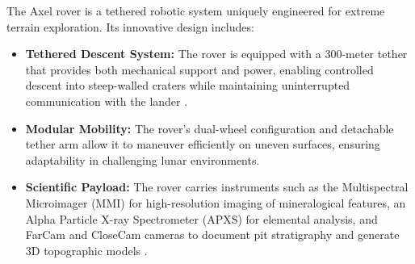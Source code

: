 The Axel rover is a tethered robotic system uniquely engineered for extreme terrain exploration. Its innovative design includes:
\begin{itemize}
    \item \textbf{Tethered Descent System:} The rover is equipped with a 300-meter tether that provides both mechanical support and power, enabling controlled descent into steep-walled craters while maintaining uninterrupted communication with the lander \cite{kerber2016}.
    \item \textbf{Modular Mobility:} The rover’s dual-wheel configuration and detachable tether arm allow it to maneuver efficiently on uneven surfaces, ensuring adaptability in challenging lunar environments.
    \item \textbf{Scientific Payload:} The rover carries instruments such as the Multispectral Microimager (MMI) for high-resolution imaging of mineralogical features, an Alpha Particle X-ray Spectrometer (APXS) for elemental analysis, and FarCam and CloseCam cameras to document pit stratigraphy and generate 3D topographic models \cite{kerber2023}.
\end{itemize}


